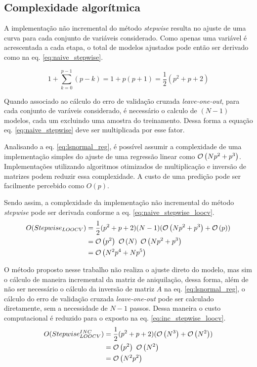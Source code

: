\subsection{Complexidade algorítmica}

A implementação não incremental do método \textit{stepwise} resulta no ajuste de uma curva para cada conjunto de variáveis considerado. Como apenas uma variável é acrescentada a cada etapa, o total de modelos ajustados pode então ser derivado como na eq. \ref{eq:naive_stepwise}.

\begin{equation}
    1 + \sum^{p-1}_{k=0} (p-k) = 1+p(p+1) = \frac{1}{2}(p^2+p+2)
    \label{eq:naive_stepwise} 
\end{equation}

Quando associado ao cálculo do erro de validação cruzada \textit{leave-one-out}, para cada conjunto de varáveis considerado, é necessário o calculo de $(N-1)$ modelos, cada um excluindo uma amostra do treinamento. Dessa forma a equação eq. \ref{eq:naive_stepwise} deve ser multiplicada por esse fator.

Analisando a eq. \ref{eq:lsnormal_reg}, é possível assumir a complexidade de uma implementação simples do ajuste de uma regressão linear como $\mathcal{O}\left(Np^2 + p^3\right)$. Implementações utilizando algoritmos otimizados de multiplicação e inversão de matrizes podem reduzir essa complexidade. A custo de uma predição pode ser facilmente percebido como $O(p)$.

Sendo assim, a complexidade da implementação não incremental do método \textit{stepwise} pode ser derivada conforme a eq. \ref{eq:naive_stepwise_loocv}.
\begin{equation}
    \begin{split}
        O(Stepwise_{LOOCV}) &= \frac{1}{2}(p^2+p+2)(N-1)(\mathcal{O}\left(Np^2 + p^3\right)+\mathcal{O}\left(p\right)) \\
                            &= \mathcal{O}\left(p^2\right)\ \mathcal{O}\left(N\right)\ \mathcal{O}\left(Np^2 + p^3\right) \\
                            &= \mathcal{O}\left(N^2p^4 + Np^5\right)
    \end{split}
    \label{eq:naive_stepwise_loocv}
\end{equation}

O método proposto nesse trabalho não realiza o ajuste direto do modelo, mas sim o cálculo de maneira incremental da matriz de aniquilação, dessa forma, além de não ser necessário o cálculo da inversão de matriz $A$ na eq. \ref{eq:lsnormal_reg}, o cálculo do erro de validação cruzada \textit{leave-one-out} pode ser calculado diretamente, sem a necessidade de $N-1$ passos. Dessa maneira o custo computacional é reduzido para o exposto na eq. \ref{eq:inc_stepwise_loocv}.
\begin{equation}
    \begin{split}
        O(Stepwise_{LOOCV}^{INC}) &= \frac{1}{2}(p^2+p+2)(\mathcal{O}\left(N^3\right)+\mathcal{O}\left(N^2\right)) \\
                            &= \mathcal{O}\left(p^2\right)\ \mathcal{O}\left(N^2\right) \\
                            &= \mathcal{O}\left(N^2p^2\right)
    \end{split}
    \label{eq:inc_stepwise_loocv}
\end{equation}

